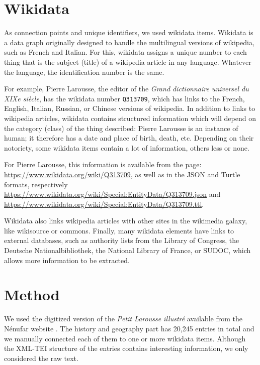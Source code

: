 \documentclass[10pt, a4paper]{article}
\begin{document}

\section{Wikidata}
As connection points and unique identifiers, we used wikidata items. Wikidata is a data graph originally designed to handle the multilingual versions of wikipedia, such as French and Italian. For this, wikidata assigns a unique number to each thing that is the subject (title) of a wikipedia article in any language. Whatever the language, the identification number is the same.

For example, Pierre Larousse, the editor of the \textit{Grand dictionnaire universel du XIXe siècle}, has the wikidata number \verb=Q313709=, which has links to the French, English, Italian, Russian, or Chinese versions of wikipedia. In addition to links to wikipedia articles, wikidata contains structured information which will depend on the category (class) of the thing described: Pierre Larousse is an instance of human; it therefore has a date and place of birth, death, etc. Depending on their notoriety, some wikidata items contain a lot of information, others less or none. 

For Pierre Larousse, this information is available from the page: \url{https://www.wikidata.org/wiki/Q313709}, as well as in the JSON and Turtle formats, respectively \url{https://www.wikidata.org/wiki/Special:EntityData/Q313709.json} and \url{https://www.wikidata.org/wiki/Special:EntityData/Q313709.ttl}.

Wikidata also links wikipedia articles with other sites in the wikimedia galaxy, like wikisource or commons. Finally, many wikidata elements have links to external databases, such as authority lists from the Library of Congress, the Deutsche Nationalbibliothek, the National Library of France, or SUDOC, which allows more information to be extracted.


\section{Method}
\label{sec:method}
We used the digitized version of the \textit{Petit Larousse illustré} available from the Nénufar website \cite{bohbot2018}. The history and geography part has 20,245 entries in total and we manually connected each of them to one or more wikidata items. Although the XML-TEI structure of the entries contains interesting information, we only considered the raw text.
\end{document}
